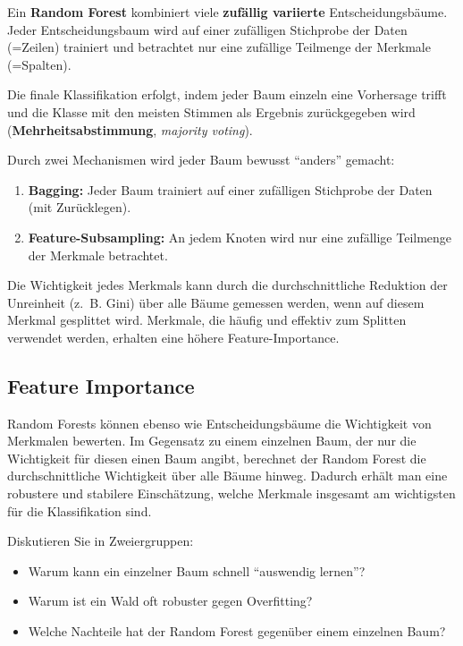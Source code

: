 \begin{mydefinition}
    Ein \textbf{Random Forest} kombiniert viele \textbf{zufällig variierte} Entscheidungsbäume. Jeder Entscheidungsbaum wird auf einer zufälligen Stichprobe der Daten (=Zeilen) trainiert und betrachtet nur eine zufällige Teilmenge der Merkmale (=Spalten).

    Die finale Klassifikation erfolgt, indem jeder Baum einzeln eine Vorhersage trifft und die Klasse mit den meisten Stimmen als Ergebnis zurückgegeben wird (\textbf{Mehrheitsabstimmung}, \textit{majority voting}).
\end{mydefinition}

\begin{mydefinition}
    Durch zwei Mechanismen wird jeder Baum bewusst \enquote{anders} gemacht:
    \begin{enumerate}
        \item \textbf{Bagging:} Jeder Baum trainiert auf einer zufälligen Stichprobe der Daten
              (mit Zurücklegen).
        \item \textbf{Feature-Subsampling:} An jedem Knoten wird nur eine zufällige Teilmenge
              der Merkmale betrachtet.
    \end{enumerate}
\end{mydefinition}

Die Wichtigkeit jedes Merkmals kann durch die durchschnittliche Reduktion der Unreinheit (z.~B. Gini) über alle Bäume gemessen werden, wenn auf diesem Merkmal gesplittet wird. Merkmale, die häufig und effektiv zum Splitten verwendet werden, erhalten eine höhere Feature-Importance.

\subsection{Feature Importance}
\begin{mydefinition}
    Random Forests können ebenso wie Entscheidungsbäume die Wichtigkeit von Merkmalen bewerten. Im Gegensatz zu einem einzelnen Baum, der nur die Wichtigkeit für diesen einen Baum angibt, berechnet der Random Forest die durchschnittliche Wichtigkeit über alle Bäume hinweg. Dadurch erhält man eine robustere und stabilere Einschätzung, welche Merkmale insgesamt am wichtigsten für die Klassifikation sind.
\end{mydefinition}

\begin{myexercise}
    Diskutieren Sie in Zweiergruppen:
    \begin{itemize}
        \item Warum kann ein einzelner Baum schnell \enquote{auswendig lernen}?
        \item Warum ist ein Wald oft robuster gegen Overfitting?
        \item Welche Nachteile hat der Random Forest gegenüber einem einzelnen Baum?
    \end{itemize}
\end{myexercise}

